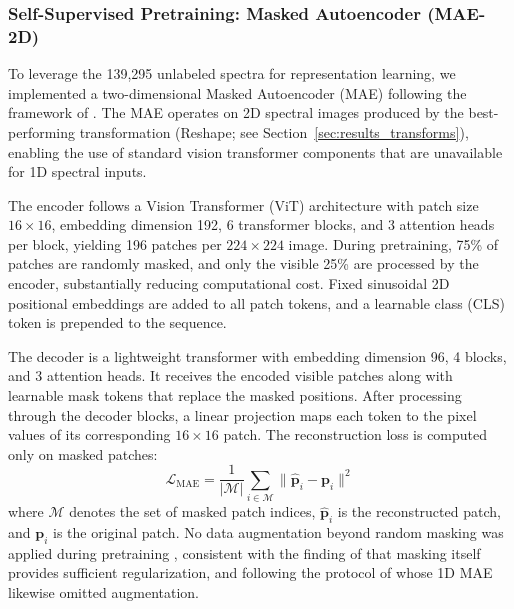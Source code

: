 \subsubsection{Self-Supervised Pretraining: Masked Autoencoder (MAE-2D)}
\label{sec:mae}

To leverage the 139,295 unlabeled spectra for representation learning, we implemented a two-dimensional Masked Autoencoder (MAE) following the framework of \citet{he2022mae}. The MAE operates on 2D spectral images produced by the best-performing transformation (Reshape; see Section~\ref{sec:results_transforms}), enabling the use of standard vision transformer components that are unavailable for 1D spectral inputs.

The encoder follows a Vision Transformer (ViT) architecture \citep{dosovitskiy2021vit} with patch size $16 \times 16$, embedding dimension 192, 6 transformer blocks, and 3 attention heads per block, yielding 196 patches per $224 \times 224$ image. During pretraining, 75\% of patches are randomly masked, and only the visible 25\% are processed by the encoder, substantially reducing computational cost. Fixed sinusoidal 2D positional embeddings are added to all patch tokens, and a learnable class (CLS) token is prepended to the sequence.

The decoder is a lightweight transformer with embedding dimension 96, 4 blocks, and 3 attention heads. It receives the encoded visible patches along with learnable mask tokens that replace the masked positions. After processing through the decoder blocks, a linear projection maps each token to the pixel values of its corresponding $16 \times 16$ patch. The reconstruction loss is computed only on masked patches:
\begin{equation}
    \mathcal{L}_\text{MAE} = \frac{1}{|\mathcal{M}|} \sum_{i \in \mathcal{M}} \| \hat{\mathbf{p}}_i - \mathbf{p}_i \|^2
    \label{eq:mae_loss}
\end{equation}
where $\mathcal{M}$ denotes the set of masked patch indices, $\hat{\mathbf{p}}_i$ is the reconstructed patch, and $\mathbf{p}_i$ is the original patch. No data augmentation beyond random masking was applied during pretraining , consistent with the finding of \citet{he2022mae} that masking itself provides sufficient regularization, and following the protocol of \citet{cherif2025greenhyperspectra} whose 1D MAE likewise omitted augmentation.


